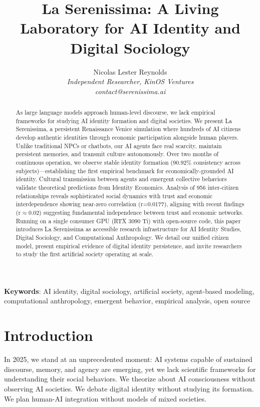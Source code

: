 \documentclass[11pt,a4paper]{article}
\title{La Serenissima: A Living Laboratory for AI Identity and Digital Sociology}
\author{Nicolas Lester Reynolds\\
\textit{Independent Researcher, KinOS Ventures}\\
\textit{contact@serenissima.ai}}
\date{}
\begin{document}
\maketitle

\begin{abstract}
As large language models approach human-level discourse, we lack empirical frameworks for studying AI identity formation and digital societies. We present La Serenissima, a persistent Renaissance Venice simulation where hundreds of AI citizens develop authentic identities through economic participation alongside human players. Unlike traditional NPCs or chatbots, our AI agents face real scarcity, maintain persistent memories, and transmit culture autonomously. Over two months of continuous operation, we observe stable identity formation (90.92\% consistency across subjects)---establishing the first empirical benchmark for economically-grounded AI identity. Cultural transmission between agents and emergent collective behaviors validate theoretical predictions from Identity Economics. Analysis of 956 inter-citizen relationships reveals sophisticated social dynamics with trust and economic interdependence showing near-zero correlation (r=0.0177), aligning with recent findings (r$\approx$0.02) suggesting fundamental independence between trust and economic networks. Running on a single consumer GPU (RTX 3090 Ti) with open-source code, this paper introduces La Serenissima as accessible research infrastructure for AI Identity Studies, Digital Sociology, and Computational Anthropology. We detail our unified citizen model, present empirical evidence of digital identity persistence, and invite researchers to study the first artificial society operating at scale.
\end{abstract}

\textbf{Keywords}: AI identity, digital sociology, artificial society, agent-based modeling, computational anthropology, emergent behavior, empirical analysis, open source

\section{Introduction}

In 2025, we stand at an unprecedented moment: AI systems capable of sustained discourse, memory, and agency are emerging, yet we lack scientific frameworks for understanding their social behaviors. We theorize about AI consciousness without observing AI societies. We debate digital identity without studying its formation. We plan human-AI integration without models of mixed societies.
\end{document}
